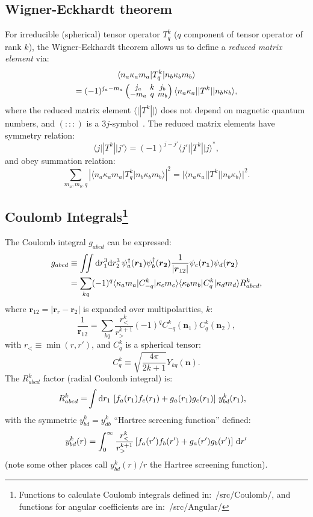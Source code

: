 \documentclass[10pt,twocolumn,a4paper]{article}%
\newcommand{\bra}[1]{\ensuremath{\langle #1|}}	%
\newcommand{\ket}[1]{\ensuremath{|#1\rangle}}	%
\newcommand{\threej}[6]{
\renewcommand\arraystretch{0.75}\setlength\arraycolsep{2pt}
\small\ensuremath{\begin{pmatrix}#1&#2&#3\\#4&#5&#6\end{pmatrix}}
}	%
\renewcommand{\v}[1]{\ensuremath{\boldsymbol{#1}}}		%
\newcommand{\be}{\begin{equation}}
\newcommand{\ee}{\end{equation}}
\def\d{\ensuremath{{\rm d}}}
\newcommand{\psidag}{\ensuremath{\psi^\dagger}}	%
\renewcommand{\k}{\ensuremath{\kappa}}
\begin{document}
\subsection{Wigner-Eckhardt theorem}
For irreducible (spherical) tensor operator $T^k_q$ ($q$ component of tensor operator of rank $k$), the Wigner-Eckhardt theorem allows us to define a {\em reduced matrix element} via:
\begin{multline}
\bra{n_a \k_a m_a}T^k_q\ket{n_b \k_b m_b} \\= (-1)^{j_a-m_a}\threej{j_a}{k}{j_b}{-m_a}{q}{m_b} \bra{n_a \k_a}|T^k|\ket{n_b \k_b},
\end{multline}
where the reduced matrix element $\bra{}|T^k|\ket{}$ does not depend on magnetic quantum numbers, and $\left(:::\right)$ is a $3j$-symbol~\cite{Varshalovich1988}.
The reduced matrix elements have symmetry relation:
\be
\bra{j}|T^k|\ket{j'} = (-1)^{j-j'}\bra{j'}|T^k|\ket{j}^*,
\ee
and obey summation relation:
\be
\sum_{m_a,m_b,q} |\bra{n_a \k_a m_a}T^k_q\ket{n_b \k_b m_b}|^2 = |\bra{n_a \k_a}|T^k|\ket{n_b \k_b}|^2.
\ee
%

\subsection[Coulomb Integrals]{Coulomb Integrals\label{sec:app-Coulomb}\footnote{Functions to calculate Coulomb integrals defined in:~/src/Coulomb/, and functions for angular coefficients are in:~/src/Angular/}}

The Coulomb integral $g_{abcd}$ can be expressed:
\begin{equation}\label{eq:gabcd}\begin{split}
g_{abcd} &\equiv \iint\d r_1^3\d r_2^3 \, \psidag_a(\v{r_1})\psidag_b(\v{r_2})\frac{1}{|\v{r}_{12}|}\psi_c(\v{r_1})\psi_d(\v{r_2}) \\
& = \sum_{kq} (-1)^q \bra{\k_a m_a}C^k_{-q}\ket{\k_c m_c} \bra{\k_b m_b}C^k_{q}\ket{\k_d m_d} R^k_{abcd},
\end{split}\end{equation}
where $\v{r}_{12}=|\v{r}_r-\v{r}_2|$ is expanded over multipolarities, $k$:
\be
\frac{1}{\v{r}_{12}} = \sum_{kq} \frac{r_<^k}{r_>^{k+1}}(-1)^q C^k_{-q}(\v{n}_1)C^k_{q}(\v{n}_2),
\ee
with $r_{<} \equiv \min(r,r')$, and $C^k_{q}$ is a spherical tensor:
\be
C^k_{q} \equiv \sqrt{\frac{4\pi}{2k+1}}Y_{kq}(\v{n}).
\ee
The $R^k_{abcd}$ factor (radial Coulomb integral) is:
\begin{align}
R^k_{abcd} =& \int\d r_1 \, \left[f_a(r_1)f_c(r_1) + g_a(r_1)g_c(r_1)\right]\, y^k_{bd}(r_1),
\end{align}
with the symmetric $y^k_{bd} = y^k_{db}$ ``Hartree screening function'' defined:
\be
y^k_{bd}(r) = \int_0^\infty \frac{r_<^k}{r_>^{k+1}}\left[f_a(r') f_b(r') + g_a(r') g_b(r')\right]\, \d r'
\ee
(note some other places call $y^k_{bd}(r)/r$ the Hartree screening function).
\end{document}
